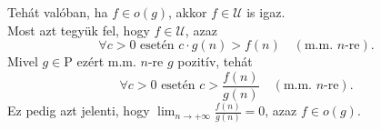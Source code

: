 \documentclass[12pt]{article}
\begin{document}
    Tehát valóban, ha $f \in o(g)$, akkor $f \in \mathscr{U}$ is igaz. \\

    Most azt tegyük fel, hogy $f \in \mathscr{U}$, azaz
    \[
        \forall c > 0 \text{ esetén } c \cdot g(n) > f(n) \quad (\text{m.m. $n$-re}).
    \]
    Mivel $g \in \mathrm{P}$ ezért m.m. $n$-re $g$ pozitív, tehát 
    \[
        \forall c > 0 \text{ esetén } c > \frac{f(n)}{g(n)} \quad (\text{m.m. $n$-re}).
    \]
    Ez pedig azt jelenti, hogy $\displaystyle \lim_{n \to + \infty} \frac{f(n)}{g(n)} = 0$, azaz $f \in o(g)$.
    
\end{document}
